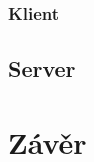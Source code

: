 \documentclass[12pt, a4paper]{article}
\begin{document}
\subsubsection{Klient}

\subsection{Server}

\newpage
\section{Závěr}  %
\end{document}
